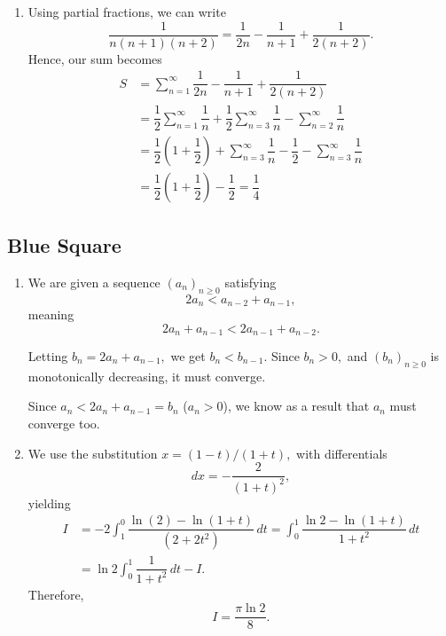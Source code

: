 \documentclass[12pt]{article}
\begin{document}
\begin{enumerate}
  \item[5] Using partial fractions, we can write
    $$
    \dfrac{1}{n(n + 1)(n+2)} = \dfrac{1}{2n} - \dfrac1{n + 1} +
    \dfrac{1}{2(n + 2)}.
    $$
    Hence, our sum becomes
    \begin{align*}
      S &= \sum_{n = 1}^{\infty} \dfrac{1}{2n} - \dfrac{1}{n + 1} +
      \dfrac{1}{2(n+2)} \\
      &= \dfrac{1}2{}\sum_{n = 1}^{\infty} \dfrac{1}n{} +
      \dfrac{1}{2} \sum_{n = 3}^{\infty}\dfrac{1}{n} - \sum_{n =
      2}^{\infty}\dfrac{1}{n} \\
      &= \dfrac{1}{2} \left(
        1 + \dfrac{1}{2}
      \right) + \sum_{n = 3}^{\infty} \dfrac{1}n{} - \dfrac{1}2{} -
      \sum_{n = 3}^{\infty} \dfrac{1}{n} \\
      &= \dfrac{1}{2}\left(1 + \dfrac{1}{2}\right) - \dfrac{1}{2} = \dfrac{1}4{}
    \end{align*}
\end{enumerate}

\subsection{Blue Square}
\begin{enumerate}
  \item[8] We are given a sequence $(a_n)_{n \geq 0}$ satisfying $$
    2a_n < a_{n -2} + a_{n - 1},
    $$
    meaning
    $$
    2a_{n} + a_{n - 1} < 2a_{n -1} + a_{n - 2}.
    $$

    Letting $b_n = 2a_n + a_{n - 1},$ we get $b_n < b_{n - 1}.$ Since
    $b_n > 0,$ and $(b_n)_{n \geq 0}$ is monotonically decreasing, it
    must converge.

    Since $a_n < 2a_n + a_{n - 1} = b_n$ ($a_n > 0$), we know as a
    result that $a_n$ must converge too.

  \item[9] We use the substitution $x = (1-t)/(1+t),$ with differentials
    $$
    dx = -\dfrac{2}{(1+t)^2},
    $$
    yielding
    \begin{align*}
      I &= -2\int_{1}^{0} \dfrac{\ln(2) - \ln(1+t)}{(2 + 2t^2)} \, dt
      = \int_{0}^{1} \dfrac{\ln 2 - \ln(1+t)}{1 + t^2} \, dt \\
      &= \ln 2\int_{0}^{1} \dfrac{1}{1+t^2} \, dt - I.
    \end{align*}
    Therefore,
    $$
    I = \dfrac{\pi\ln 2}{8}.
    $$
\end{enumerate}
\end{document}
